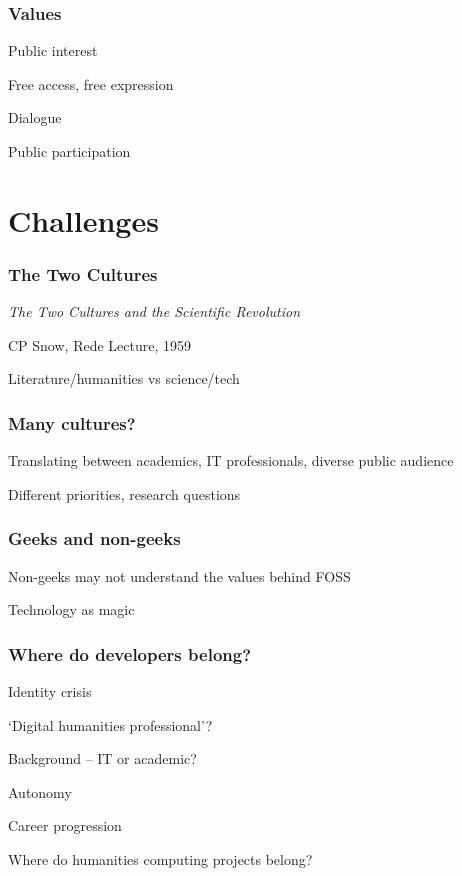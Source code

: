 \documentclass[ignorenonframetext,11pt]{beamer}
\begin{document}
\begin{frame}
\frametitle{Values}
\label{values}

Public interest


Free access, free expression


Dialogue


Public participation



\end{frame}
		

\section{Challenges}
\label{challenges}

\begin{frame}
\frametitle{The Two Cultures}
\label{thetwocultures}

{\itshape The Two Cultures and the Scientific Revolution}


CP Snow, Rede Lecture, 1959


Literature/humanities vs science/tech



\end{frame}
		

\begin{frame}
\frametitle{Many cultures?}
\label{manycultures}

Translating between academics, IT professionals, diverse public audience


Different priorities, research questions



\end{frame}
		

\begin{frame}
\frametitle{Geeks and non-geeks}
\label{geeksandnon-geeks}

Non-geeks may not understand the values behind FOSS


Technology as magic



\end{frame}
		

\begin{frame}
\frametitle{Where do developers belong?}
\label{wheredodevelopersbelong}

Identity crisis


`Digital humanities professional'?


Background -- IT or academic?


Autonomy


Career progression


Where do humanities computing projects belong?



\end{frame}
		
\end{document}
